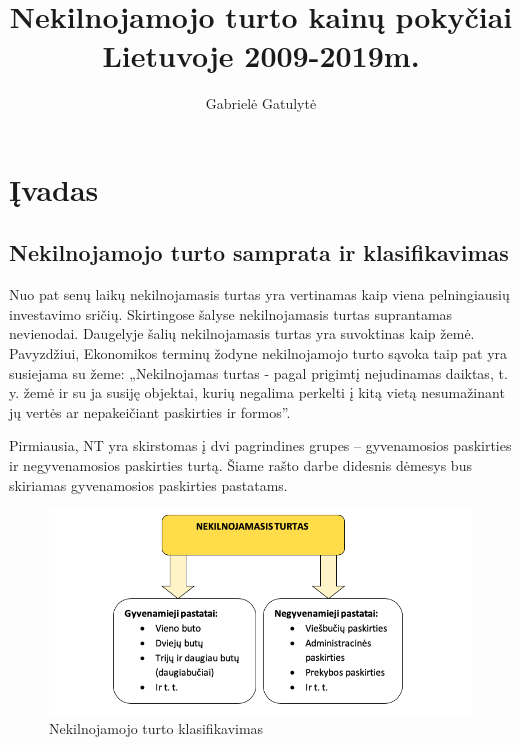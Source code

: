 \documentclass[11pt, titlepage]{article}
\title{Nekilnojamojo turto kainų pokyčiai Lietuvoje 2009-2019m.}
\author{Gabrielė Gatulytė}
\begin{document}
\maketitle
\tableofcontents
\newpage

\section{Įvadas}
\subsection{Nekilnojamojo turto samprata ir klasifikavimas}
Nuo pat senų laikų nekilnojamasis turtas yra vertinamas kaip viena pelningiausių investavimo sričių. Skirtingose šalyse nekilnojamasis turtas suprantamas nevienodai. Daugelyje šalių nekilnojamasis turtas yra suvoktinas kaip žemė. Pavyzdžiui, Ekonomikos terminų žodyne nekilnojamojo turto sąvoka taip pat yra susiejama su žeme: „Nekilnojamas turtas - pagal prigimtį nejudinamas daiktas, t. y. žemė ir su ja susiję objektai, kurių negalima perkelti į kitą vietą nesumažinant jų vertės ar nepakeičiant paskirties ir formos”. \parencite{galiniene2011ekonomikos}
\par
Pirmiausia, NT yra skirstomas į dvi pagrindines grupes – gyvenamosios paskirties ir negyvenamosios paskirties turtą. Šiame rašto darbe didesnis dėmesys bus skiriamas gyvenamosios paskirties pastatams. 
\begin{figure} [H]
\center
\includegraphics[scale=0.5]{toks}  
\caption{Nekilnojamojo turto klasifikavimas}
\end{figure}                        
\end{document}
